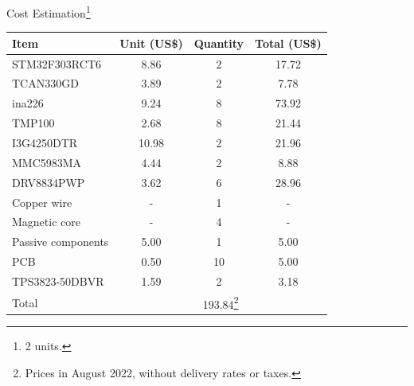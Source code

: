\documentclass{beamer}
\begin{document}
\begin{frame}{Cost Estimation\footnote{2 units.}}

\begin{table}[!htb]\scriptsize
    \centering
    \label{tab:cost-estimation}
    \begin{tabular}{lccc}
        \toprule[1.5pt]
        \textbf{Item} & \textbf{Unit (US\$)} & \textbf{Quantity} & \textbf{Total (US\$)} \\
        \midrule
        STM32F303RCT6         & 8.86     & 2  & 17.72  \\
        TCAN330GD             & 3.89  & 2  & 7.78 \\
        ina226                & 9.24  & 8  & 73.92\\
        TMP100                & 2.68  & 8  & 21.44\\
        I3G4250DTR            & 10.98 & 2  & 21.96 \\
        MMC5983MA             & 4.44  & 2  & 8.88 \\
        DRV8834PWP            & 3.62  & 6  & 28.96 \\
        Copper wire           & -     & 1  & - \\
        Magnetic core         & -     & 4  & - \\
        Passive components    & 5.00  & 1  & 5.00 \\
        PCB                   & 0.50  & 10 & 5.00 \\
        TPS3823-50DBVR        & 1.59  & 2 & 3.18 \\
        \midrule
        Total          & \multicolumn{3}{c}{193.84\footnote{Prices in August 2022, without delivery rates or taxes.}} \\
        \bottomrule[1.5pt]
    \end{tabular}
\end{table}

\end{frame}

\end{document}
